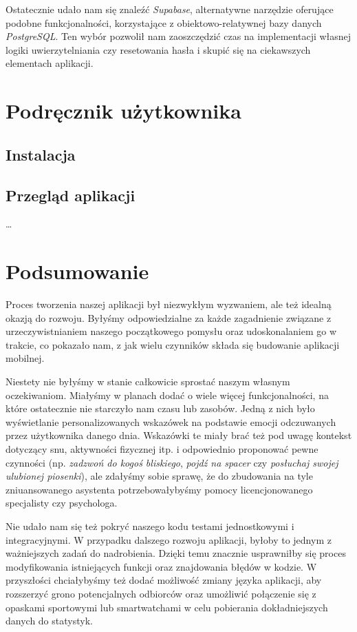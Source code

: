 \documentclass[inz, shortabstract]{iithesis}
\begin{document}
Ostatecznie udało nam się znaleźć \textit{Supabase}\cite{supabase}, alternatywne narzędzie oferujące podobne funkcjonalności, korzystające z obiektowo-relatywnej bazy danych \textit{PostgreSQL}\cite{postgresql}. Ten wybór pozwolił nam zaoszczędzić czas na implementacji własnej logiki uwierzytelniania czy resetowania hasła i skupić się na ciekawszych elementach aplikacji.
\chapter{Podręcznik użytkownika}
\section{Instalacja}
\section{Przegląd aplikacji}

\ldots

\chapter{Podsumowanie}
Proces tworzenia naszej aplikacji był niezwykłym wyzwaniem, ale też idealną okazją do rozwoju. Byłyśmy odpowiedzialne za każde zagadnienie związane z urzeczywistnianiem naszego początkowego pomysłu oraz udoskonalaniem go w trakcie, co pokazało nam, z jak wielu czynników składa się budowanie aplikacji mobilnej. 

Niestety nie byłyśmy w stanie całkowicie sprostać naszym własnym oczekiwaniom. Miałyśmy w planach dodać o wiele więcej funkcjonalności, na które ostatecznie nie starczyło nam czasu lub zasobów. Jedną z nich było wyświetlanie personalizowanych wskazówek na podstawie emocji odczuwanych przez użytkownika danego dnia. Wskazówki te miały brać też pod uwagę kontekst dotyczący snu, aktywności fizycznej itp. i odpowiednio proponować pewne czynności (np. \textit{zadzwoń do kogoś bliskiego}, \textit{pojdź na spacer} czy \textit{posłuchaj swojej ulubionej piosenki}), ale zdałyśmy sobie sprawę, że do zbudowania na tyle zniuansowanego asystenta potrzebowałybyśmy pomocy licencjonowanego specjalisty czy psychologa. 

Nie udało nam się też pokryć naszego kodu testami jednostkowymi i integracyjnymi. W przypadku dalszego rozwoju aplikacji, byłoby to jednym z ważniejszych zadań do nadrobienia. Dzięki temu znacznie usprawniłby się proces modyfikowania istniejących funkcji oraz znajdowania błędów w kodzie. W przyszłości chciałybyśmy też dodać możliwość zmiany języka aplikacji, aby rozszerzyć grono potencjalnych odbiorców oraz umożliwić połączenie się z opaskami sportowymi lub smartwatchami w celu pobierania dokładniejszych danych do statystyk.
\end{document}
